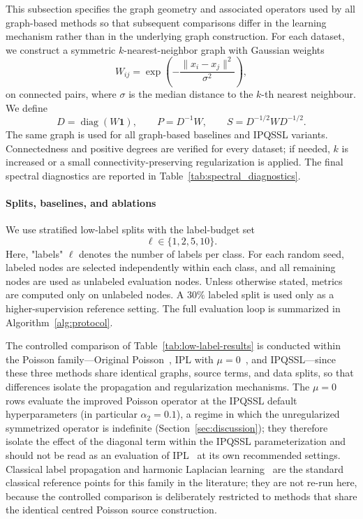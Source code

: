 \documentclass[11pt,a4paper]{article}
\begin{document}
This subsection specifies the graph geometry and associated operators used by
all graph-based methods so that subsequent comparisons differ in the learning
mechanism rather than in the underlying graph construction. For each dataset,
we construct a symmetric \(k\)-nearest-neighbor graph with
Gaussian weights
\[
    W_{ij}
    =
    \exp\left(-\frac{\|x_i-x_j\|^2}{\sigma^2}\right),
\]
on connected pairs, where \(\sigma\) is the median distance to the \(k\)-th
nearest neighbour. We define
\[
    D=\operatorname{diag}(W\mathbf 1),\qquad
    P=D^{-1}W,\qquad
    S=D^{-1/2}WD^{-1/2}.
\]
The same graph is used for all graph-based baselines and IPQSSL variants.
Connectedness and positive degrees are verified for every dataset; if needed,
\(k\) is increased or a small connectivity-preserving regularization is applied.
The final spectral diagnostics are reported in
Table~\ref{tab:spectral_diagnostics}.

\paragraph{Splits, baselines, and ablations}\label{sec:ablation}
\label{subsec:semi_supervised_splits}
We use stratified low-label splits with the label-budget set
\[
    \ell\in\{1,2,5,10\}.
\]
Here, "labels" \(\ell\) denotes the number of labels per class. For each random seed, labeled nodes are selected independently
within each class, and all remaining nodes are used as unlabeled evaluation nodes.
Unless otherwise stated, metrics are computed only on unlabeled nodes. A \(30\%\)
labeled split is used only as a higher-supervision reference setting. The
full evaluation loop is summarized in Algorithm~\ref{alg:protocol}.

The controlled comparison of Table~\ref{tab:low-label-results} is conducted
within the Poisson family---Original Poisson~\cite{calder2020poisson},
IPL with \(\mu=0\)~\cite{bozorgnia2026improved}, and IPQSSL---since these
three methods share identical graphs, source terms, and data splits, so
that differences isolate the propagation and regularization mechanisms.
The \(\mu=0\) rows evaluate the improved Poisson operator at the IPQSSL
default hyperparameters (in particular \(\alpha_2=0.1\)), a regime in
which the unregularized symmetrized operator is indefinite
(Section~\ref{sec:discussion}); they therefore isolate the effect of the
diagonal term within the IPQSSL parameterization and should not be read
as an evaluation of IPL~\cite{bozorgnia2026improved} at its own
recommended settings.
Classical label propagation and harmonic Laplacian
learning~\cite{zhu2003semi} are the standard classical reference points
for this family in the literature; they are not re-run here, because the
controlled comparison is deliberately restricted to methods that share
the identical centred Poisson source construction.
\end{document}
